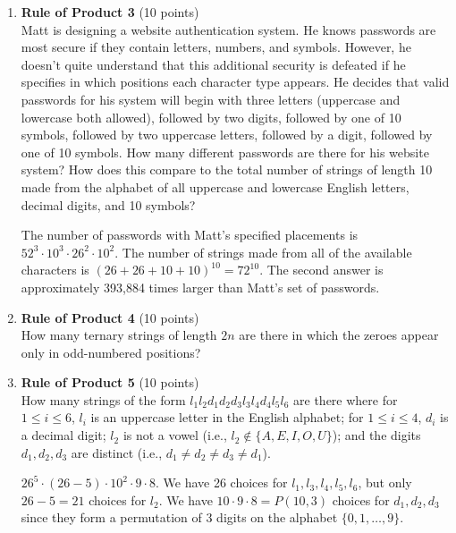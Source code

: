 \begin{enumerate}
  \item \textbf{Rule of Product 3} (10 points)\\
  Matt is designing a website authentication system. He knows passwords are most secure if they contain letters, numbers, and symbols. However, he doesn't quite understand that this additional security is defeated if he specifies in which positions each character type appears. He decides that valid passwords for his system will begin with three letters (uppercase and lowercase both allowed), followed by two digits, followed by one of 10 symbols, followed by two uppercase letters, followed by a digit, followed by one of 10 symbols. How many different passwords are there for his website system? How does this compare to the total number of strings of length 10 made from the alphabet of all uppercase and lowercase English letters, decimal digits, and 10 symbols?
  \begin{subanswer}
    The number of passwords with Matt's specified placements is $52^3 \cdot 10^3 \cdot 26^2 \cdot 10^2$. The number of strings made from all of the available characters is $(26+26+10+10)^{10} = 72^{10}$. The second answer is approximately 393,884 times larger than Matt's set of passwords.
  \end{subanswer}

  \item \textbf{Rule of Product 4} (10 points)\\
  How many ternary strings of length $2n$ are there in which the zeroes appear only in odd-numbered positions?
  \begin{subanswer}
  \end{subanswer}

  \item \textbf{Rule of Product 5} (10 points)\\
  How many strings of the form $l_1 l_2 d_1 d_2 d_3 l_3 l_4 d_4 l_5 l_6$ are there where
  for $1 \leq i \leq 6$, $l_i$ is an uppercase letter in the English alphabet;
  for $1 \leq i \leq 4$, $d_i$ is a decimal digit;
  $l_2$ is not a vowel (i.e., $l_2 \notin \{A,E,I,O,U\}$); and
  the digits $d_1, d_2, d_3$ are distinct (i.e., $d_1 \neq d_2 \neq d_3 \neq d_1$).
  \begin{subanswer}
    $26^5 \cdot (26-5) \cdot 10^2 \cdot 9 \cdot 8$. We have 26 choices for $l_1, l_3, l_4, l_5, l_6$, but only $26-5=21$ choices for $l_2$. We have $10 \cdot 9 \cdot 8 = P(10,3)$ choices for $d_1, d_2, d_3$ since they form a permutation of 3 digits on the alphabet $\{0,1,\ldots,9\}$.
  \end{subanswer}


\end{enumerate}

